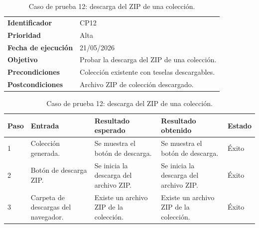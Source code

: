 \begin{table}[]
	\centering
	\footnotesize
	\renewcommand{\arraystretch}{1.2}
	\begin{tabularx}{\textwidth}{p{3.2cm} X}
		\toprule
		\textbf{Identificador} & CP12 \\
		\textbf{Prioridad} & Alta \\
		\textbf{Fecha de ejecución} & 21/05/2026 \\
		\textbf{Objetivo} & Probar la descarga del ZIP de una colección. \\
		\textbf{Precondiciones} & Colección existente con teselas descargables. \\
		\textbf{Postcondiciones} & Archivo ZIP de colección descargado. \\
		\midrule
	\end{tabularx}
	\begin{tabularx}{\textwidth}{p{0.8cm} p{3.2cm} X X p{1.3cm}}
		\textbf{Paso} & \textbf{Entrada} & \textbf{Resultado esperado} & \textbf{Resultado obtenido} & \textbf{Estado} \\
		\midrule
		1 & Colección generada. & Se muestra el botón de descarga. & Se muestra el botón de descarga. & Éxito \\
		2 & Botón de descarga ZIP. & Se inicia la descarga del archivo ZIP. & Se inicia la descarga del archivo ZIP. & Éxito \\
		3 & Carpeta de descargas del navegador. & Existe un archivo ZIP de la colección. & Existe un archivo ZIP de la colección. & Éxito \\
		\bottomrule
	\end{tabularx}
	\caption{Caso de prueba 12: descarga del ZIP de una colección.}
	\label{tab:cp12}
\end{table}


